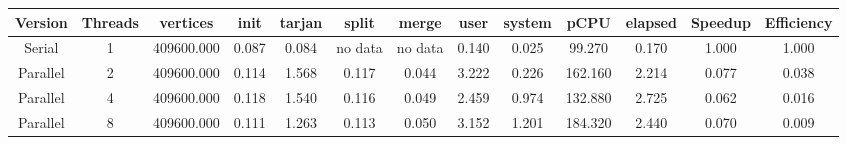 \begin{tabular}{|c|c|c|c|c|c|c|c|c|c|c|c|c|}
\toprule
 Version &  Threads &   vertices &  init &  tarjan &   split &   merge &  user &  system &    pCPU &  elapsed &  Speedup &  Efficiency \\
\midrule
  Serial &        1 & 409600.000 & 0.087 &   0.084 & no data & no data & 0.140 &   0.025 &  99.270 &    0.170 &    1.000 &       1.000 \\
Parallel &        2 & 409600.000 & 0.114 &   1.568 &   0.117 &   0.044 & 3.222 &   0.226 & 162.160 &    2.214 &    0.077 &       0.038 \\
Parallel &        4 & 409600.000 & 0.118 &   1.540 &   0.116 &   0.049 & 2.459 &   0.974 & 132.880 &    2.725 &    0.062 &       0.016 \\
Parallel &        8 & 409600.000 & 0.111 &   1.263 &   0.113 &   0.050 & 3.152 &   1.201 & 184.320 &    2.440 &    0.070 &       0.009 \\
\bottomrule
\end{tabular}
